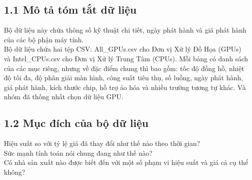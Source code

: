 \documentclass[a4paper]{article}
\newcommand{\gachdau}{\hspace*{1.5em}\ignorespaces}
\begin{document}
        \subsection*{1.1 Mô tả tóm tắt dữ liệu}
            \gachdau
            Bộ dữ liệu này chứa thông số kỹ thuật chi tiết, ngày phát hành và giá phát hành của các bộ phận máy tính.\\
            \gachdau
            Bộ dữ liệu chứa hai tệp CSV: All\_GPUs.csv cho Đơn vị Xử lý Đồ Họa (GPUs) và Intel\_CPUs.csv cho Đơn vị Xử lý Trung Tâm (CPUs). Mỗi bảng có danh sách của các mục riêng, nhưng về đặc điểm chung thì bao gồm: tốc độ đồng hồ, nhiệt độ tối đa, độ phân giải màn hình, công suất tiêu thụ, số luồng, ngày phát hành, giá phát hành, kích thước chip, hỗ trợ ảo hóa và nhiều trường tương tự khác. Và nhóm đã thống nhất chọn dữ liệu GPU.
            
        \subsection*{1.2 Mục đích của bộ dữ liệu}
            \gachdau
            Hiệu suất so với tỷ lệ giá đã thay đổi như thế nào theo thời gian?\\
            \gachdau
            Sức mạnh tính toán nói chung đang như thế nào?\\
            \gachdau
            Có nhà sản xuất nào được biết đến với một số phạm vi hiệu suất và giá cả cụ thể không?

    
\end{document}
